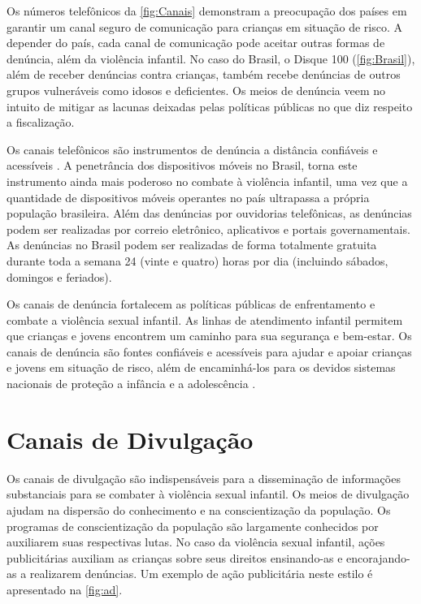 Os números telefônicos da \autoref{fig:Canais} demonstram a preocupação dos países em garantir um canal seguro de comunicação para crianças em situação de risco. A depender do país, cada canal de comunicação pode aceitar outras formas de denúncia, além da violência infantil. No caso do Brasil, o Disque 100 (\autoref{fig:Brasil}), além de receber denúncias contra crianças, também recebe denúncias de outros grupos vulneráveis como idosos e deficientes. Os meios de denúncia veem no intuito de mitigar as lacunas deixadas pelas políticas públicas no que diz respeito a fiscalização.

Os canais telefônicos são instrumentos de denúncia a distância confiáveis e acessíveis \cite{UNICEF2017new}. A penetrância dos dispositivos móveis no Brasil, torna este instrumento ainda mais poderoso no combate à violência infantil, uma vez que a quantidade de dispositivos móveis operantes no país ultrapassa a própria população brasileira. Além das denúncias por ouvidorias telefônicas, as denúncias podem ser realizadas por correio eletrônico, aplicativos e portais governamentais. As denúncias no Brasil podem ser realizadas de forma totalmente gratuita durante toda a semana 24 (vinte e quatro) horas por dia (incluindo sábados, domingos e feriados).

Os canais de denúncia fortalecem as políticas públicas de enfrentamento e combate a violência sexual infantil. As linhas de atendimento infantil permitem que crianças e jovens encontrem um caminho para sua segurança e bem-estar. Os canais de denúncia são fontes confiáveis e acessíveis para ajudar e apoiar crianças e jovens em situação de risco, além de encaminhá-los para os devidos sistemas nacionais de proteção a infância e a adolescência \cite{UNICEF2017new}.


\section{Canais de Divulgação}\label{sec:propagandas}

Os canais de divulgação são indispensáveis para a disseminação de informações substanciais para se combater à violência sexual infantil. Os meios de divulgação ajudam na dispersão do conhecimento e na conscientização da população. Os programas de conscientização da população são largamente conhecidos por auxiliarem suas respectivas lutas. %
No caso da violência sexual infantil, ações publicitárias auxiliam as crianças sobre seus direitos ensinando-as e encorajando-as a realizarem denúncias. Um exemplo de ação publicitária neste estilo é apresentado na \autoref{fig:ad}.

